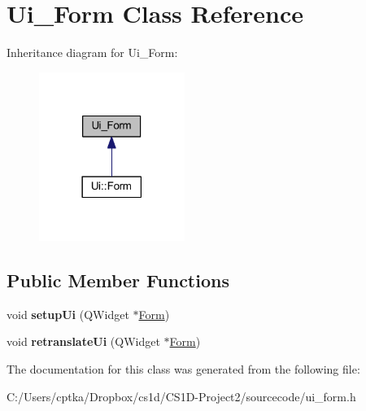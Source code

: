 \hypertarget{class_ui___form}{}\section{Ui\+\_\+\+Form Class Reference}
\label{class_ui___form}


Inheritance diagram for Ui\+\_\+\+Form\+:
\nopagebreak
\begin{figure}[H]
\begin{center}
\leavevmode
\includegraphics[width=134pt]{class_ui___form__inherit__graph}
\end{center}
\end{figure}
\subsection*{Public Member Functions}
\begin{DoxyCompactItemize}
\item 
\mbox{\label{class_ui___form_a90f69afe5c674331bdf041a051aee259}} 
void {\bfseries setup\+Ui} (Q\+Widget $\ast$\mbox{\hyperlink{class_form}{Form}})
\item 
\mbox{\label{class_ui___form_ad05dfdbcadce5efd8a7e8da759e41aa4}} 
void {\bfseries retranslate\+Ui} (Q\+Widget $\ast$\mbox{\hyperlink{class_form}{Form}})
\end{DoxyCompactItemize}


The documentation for this class was generated from the following file\+:\begin{DoxyCompactItemize}
\item 
C\+:/\+Users/cptka/\+Dropbox/cs1d/\+C\+S1\+D-\/\+Project2/sourcecode/ui\+\_\+form.\+h\end{DoxyCompactItemize}
